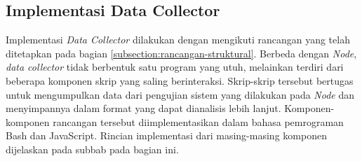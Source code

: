 \subsection{Implementasi Data Collector}
\label{subsection:implementasi-data-collector}

Implementasi \textit{Data Collector} dilakukan dengan mengikuti rancangan yang telah ditetapkan pada bagian \ref{subsection:rancangan-struktural}. Berbeda dengan \textit{Node}, \textit{data collector} tidak berbentuk satu program yang utuh, melainkan terdiri dari beberapa komponen skrip yang saling berinteraksi. Skrip-skrip tersebut bertugas untuk mengumpulkan data dari pengujian sistem yang dilakukan pada \textit{Node} dan menyimpannya dalam format yang dapat dianalisis lebih lanjut. Komponen-komponen rancangan tersebut diimplementasikan dalam bahasa pemrograman Bash dan JavaScript. Rincian implementasi dari masing-masing komponen dijelaskan pada subbab pada bagian ini.


